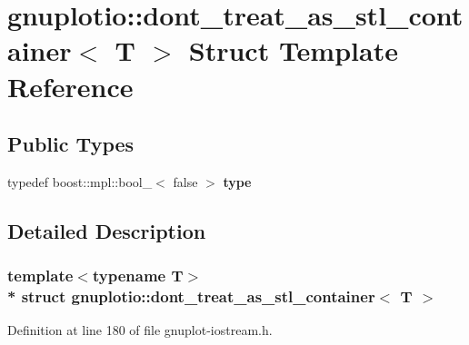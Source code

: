 \hypertarget{structgnuplotio_1_1dont__treat__as__stl__container}{}\section{gnuplotio\+:\+:dont\+\_\+treat\+\_\+as\+\_\+stl\+\_\+container$<$ T $>$ Struct Template Reference}
\label{structgnuplotio_1_1dont__treat__as__stl__container}
\subsection*{Public Types}
\begin{DoxyCompactItemize}
\item 
typedef boost\+::mpl\+::bool\+\_\+$<$ false $>$ {\bfseries type}\hypertarget{structgnuplotio_1_1dont__treat__as__stl__container_aa4404164a7547142376a9140ef07fd2a}{}\label{structgnuplotio_1_1dont__treat__as__stl__container_aa4404164a7547142376a9140ef07fd2a}

\end{DoxyCompactItemize}


\subsection{Detailed Description}
\subsubsection*{template$<$typename T$>$\\*
struct gnuplotio\+::dont\+\_\+treat\+\_\+as\+\_\+stl\+\_\+container$<$ T $>$}



Definition at line 180 of file gnuplot-\/iostream.\+h.

